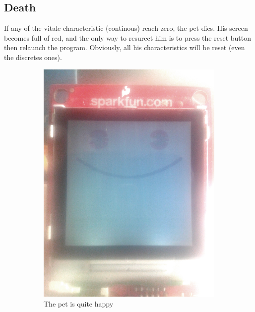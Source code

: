 \documentclass[a4paper]{article}
\begin{document}
\subsection{Death}
If any of the vitale characteristic (continous) reach zero, the pet dies. His screen becomes full of red, and the only way to resurect him is to press the reset button then relaunch the program. Obviously, all his characteristics will be reset (even the discretes ones).

\begin{figure}[h]
  \centering
  \begin{subfigure}[b]{0.3\textwidth}
    \includegraphics[width=\textwidth]{Pictures/smiling.png}
    \caption{\label{fig:smile:happy} The pet is quite happy}
  \end{subfigure}
  \begin{subfigure}[b]{0.3\textwidth}

\end{subfigure}
\end{figure}
\end{document}
